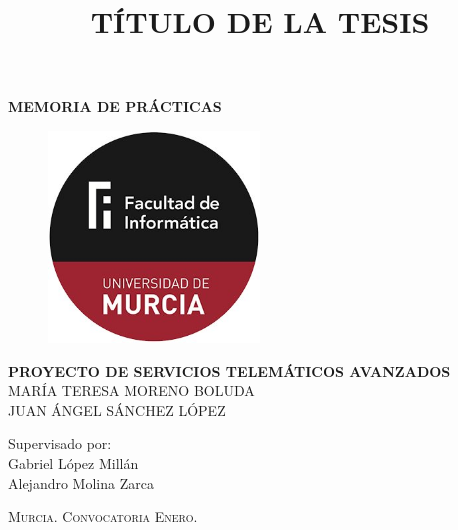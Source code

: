 \documentclass[a4paper]{article}
\begin{document}

\title{TÍTULO DE LA TESIS} %

\begin{titlepage}
\begin{center}

\textsc{\huge \textbf{MEMORIA DE PRÁCTICAS}}\\[1em]

\begin{figure}[h]
\begin{center}
\includegraphics[width=0.5\textwidth]{facu.jpg}
\end{center}
\end{figure}

\vspace{1em}

\textsc{\huge \textbf{PROYECTO DE SERVICIOS TELEMÁTICOS AVANZADOS}}\\[1em] 



\textsc{\Large MARÍA TERESA MORENO BOLUDA}\\[1em]

\textsc{\Large JUAN ÁNGEL SÁNCHEZ LÓPEZ}\\[1em]

\vspace{3em}

\begin{large}
Supervisado por: \\
Gabriel López Millán \\ Alejandro Molina Zarca
\end{large}

\end{center}



\vspace*{\fill}
\textsc{Murcia. \hspace*{\fill} Convocatoria Enero.}

\end{titlepage}
\end{document}
